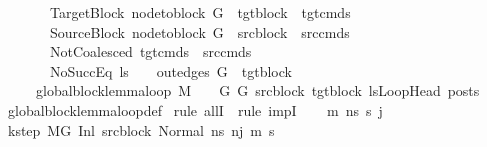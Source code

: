 \begin{isabellebody}
\ \ \ \ \ \ \ TargetBlock{\isacharcolon}{\kern0pt}\ {\isachardoublequoteopen}node{\isacharunderscore}{\kern0pt}to{\isacharunderscore}{\kern0pt}block\ G{\isacharprime}{\kern0pt}\ {\isacharbang}{\kern0pt}\ tgt{\isacharunderscore}{\kern0pt}block\ {\isacharequal}{\kern0pt}\ tgt{\isacharunderscore}{\kern0pt}cmds{\isachardoublequoteclose}\isanewline
\ \ \ \ \ \ \ SourceBlock{\isacharcolon}{\kern0pt}\ {\isachardoublequoteopen}node{\isacharunderscore}{\kern0pt}to{\isacharunderscore}{\kern0pt}block\ G\ {\isacharbang}{\kern0pt}\ src{\isacharunderscore}{\kern0pt}block\ {\isacharequal}{\kern0pt}\ src{\isacharunderscore}{\kern0pt}cmds{\isachardoublequoteclose}\isanewline
\ \ \ \ \ \ \ NotCoalesced{\isacharcolon}{\kern0pt}\ {\isachardoublequoteopen}tgt{\isacharunderscore}{\kern0pt}cmds\ {\isacharequal}{\kern0pt}\ src{\isacharunderscore}{\kern0pt}cmds{\isachardoublequoteclose}\isanewline
\ \ \ \ \ \ \ NoSuccEq{\isacharcolon}{\kern0pt}\ {\isachardoublequoteopen}ls\ {\isacharequal}{\kern0pt}\ {\isacharbrackleft}{\kern0pt}{\isacharbrackright}{\kern0pt}\ {\isasymLongrightarrow}\ out{\isacharunderscore}{\kern0pt}edges\ G{\isacharprime}{\kern0pt}\ {\isacharbang}{\kern0pt}\ tgt{\isacharunderscore}{\kern0pt}block\ {\isacharequal}{\kern0pt}\ {\isacharbrackleft}{\kern0pt}{\isacharbrackright}{\kern0pt}{\isachardoublequoteclose}\isanewline
\ \ \ \ \ {\isachardoublequoteopen}global{\isacharunderscore}{\kern0pt}block{\isacharunderscore}{\kern0pt}lemma{\isacharunderscore}{\kern0pt}loop\ M\ {\isasymLambda}\ {\isasymGamma}\ {\isasymOmega}\ G\ G{\isacharprime}{\kern0pt}\ src{\isacharunderscore}{\kern0pt}block\ tgt{\isacharunderscore}{\kern0pt}block\ lsLoopHead\ posts{\isachardoublequoteclose}\isanewline
%
\isadelimproof
\ \ %
\endisadelimproof
%
\isatagproof
{}\isamarkupfalse%
\ global{\isacharunderscore}{\kern0pt}block{\isacharunderscore}{\kern0pt}lemma{\isacharunderscore}{\kern0pt}loop{\isacharunderscore}{\kern0pt}def\isanewline
{}\isamarkupfalse%
\ {\isacharparenleft}{\kern0pt}rule\ allI\ {\isacharbar}{\kern0pt}\ rule\ impI{\isacharparenright}{\kern0pt}{\isacharplus}{\kern0pt}\isanewline
\ \ \isamarkupfalse%
\ m{\isacharprime}{\kern0pt}\ ns\ s{\isacharprime}{\kern0pt}\ j\isanewline
\ \ \isamarkupfalse%
\ k{\isacharunderscore}{\kern0pt}step{\isacharcolon}{\kern0pt}\ {\isachardoublequoteopen}M{\isacharcomma}{\kern0pt}{\isasymLambda}{\isacharcomma}{\kern0pt}{\isasymGamma}{\isacharcomma}{\kern0pt}{\isasymOmega}{\isacharcomma}{\kern0pt}G\ {\isasymturnstile}{\isacharparenleft}{\kern0pt}Inl\ src{\isacharunderscore}{\kern0pt}block{\isacharcomma}{\kern0pt}\ Normal\ ns{\isacharparenright}{\kern0pt}\ {\isacharminus}{\kern0pt}n{\isasymrightarrow}{\isacharcircum}{\kern0pt}j\ {\isacharparenleft}{\kern0pt}m{\isacharprime}{\kern0pt}{\isacharcomma}{\kern0pt}\ s{\isacharprime}{\kern0pt}{\isacharparenright}{\kern0pt}{\isachardoublequoteclose}\ \isanewline

\end{isabellebody}
